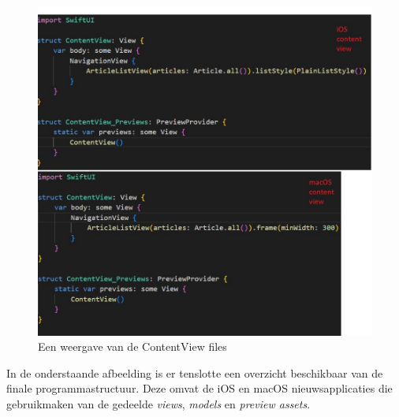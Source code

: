 \begin{figure}[!h]
    \centering
    \includegraphics[width=\linewidth]{img/contentview.jpg}
    \caption{Een weergave van de ContentView files}
\end{figure}

\pagebreak
In de onderstaande afbeelding is er tenslotte een overzicht beschikbaar van de finale programmastructuur. Deze omvat de iOS en macOS nieuwsapplicaties die gebruikmaken van de gedeelde \textit{views}, \textit{models} en \textit{preview assets}.

